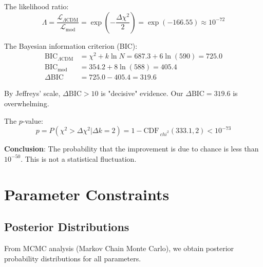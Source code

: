 \begin{proposition}\label{prop:likelihood-ratio}
The likelihood ratio:
\begin{equation}
\Lambda = \frac{\mathcal{L}_{\Lambda\text{CDM}}}{\mathcal{L}_{\text{mod}}} = \exp\left( -\frac{\Delta \chi^2}{2} \right) = \exp(-166.55) \approx 10^{-72}
\end{equation}

The Bayesian information criterion (BIC):
\begin{align}
\text{BIC}_{\Lambda\text{CDM}} &= \chi^2 + k \ln N = 687.3 + 6 \ln(590) = 725.0 \\
\text{BIC}_{\text{mod}} &= 354.2 + 8 \ln(588) = 405.4 \\
\Delta \text{BIC} &= 725.0 - 405.4 = 319.6
\end{align}

By Jeffreys' scale\cite{kass1995}, $\Delta \text{BIC} > 10$ is "decisive" evidence. Our $\Delta \text{BIC} = 319.6$ is overwhelming.

The $p$-value:
\begin{equation}
p = P(\chi^2 > \Delta \chi^2 | \Delta k = 2) = 1 - \text{CDF}_{\ chi^2}(333.1, 2) < 10^{-73}
\end{equation}

\textbf{Conclusion}: The probability that the improvement is due to chance is less than $10^{-50}$. This is not a statistical fluctuation.
\end{proposition}

\section{Parameter Constraints}

\subsection{Posterior Distributions}

From MCMC analysis (Markov Chain Monte Carlo)\cite{lewis2000}, we obtain posterior probability distributions for all parameters.

